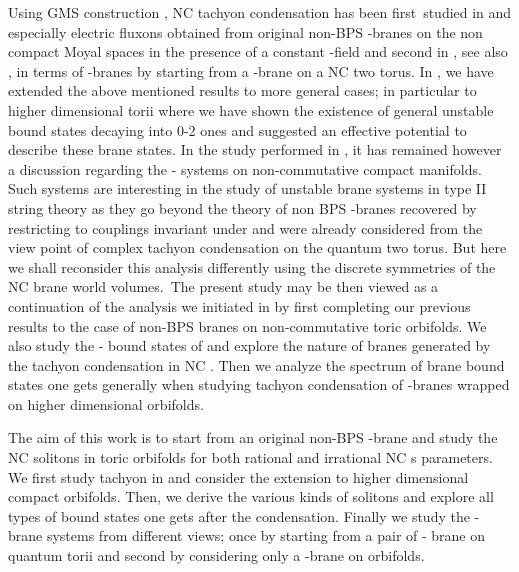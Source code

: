 \documentclass[a4paper,12pt]{article}
\begin{document}
Using GMS construction \cite{e}, NC tachyon condensation has been first\
studied in \cite{f} and especially electric fluxons obtained from original non-BPS \coordHE{}%
-branes on the non compact Moyal spaces in the presence of a constant \myHighlight{$B$}\coordHE{}-field
and second in \cite{g}, see also \cite{h,i}, in terms of \myHighlight{$D0$}\coordHE{}-branes
by starting from a \myHighlight{$D2$}\coordHE{}-brane on a NC two torus. In \cite{j}, we have
extended the above mentioned results to more general cases; in particular to
higher dimensional torii where we have shown the existence of general
unstable bound states decaying into \coordHE{}0-\myHighlight{$D$}\coordHE{}2 ones and suggested an effective
potential to describe these brane states. In the study performed in \cite{j}%
, it has remained however a discussion regarding the
\coordHE{}-\coordHE{} systems on non-commutative compact manifolds.
Such systems are interesting in the study of unstable \coordHE{} brane
systems in type II string theory as they go beyond the theory of
non BPS \myHighlight{$D$}\coordHE{}-branes recovered by restricting to couplings invariant
under \myHighlight{$(-)^{F_L}$}\coordHE{} \cite{k} and were already considered from the
view point of complex tachyon condensation on the quantum two
torus. But here we shall reconsider this analysis differently
using the discrete symmetries of the NC brane world volumes.\ The
present study may be then viewed as a continuation of the analysis
we initiated in \cite{j} by first completing our previous results
to the case of non-BPS branes on non-commutative toric orbifolds.
We also study  the \myHighlight{$D0$}\coordHE{}-\myHighlight{$D2$}\coordHE{} bound states of \cite{g} and explore
the
nature of branes generated by the tachyon condensation in NC \myHighlight{$\mathbb{T}%
_{\theta }^{2}/\mathbb{Z}_{2}$}\coordHE{}. Then we analyze the spectrum of
brane bound states one gets generally when studying tachyon
condensation of \coordHE{}-branes wrapped on higher dimensional
orbifolds.

The aim of this work is to start from an original non-BPS \coordHE{}-brane and
study the NC solitons in \myHighlight{$\mathbb{Z}_{2}$}\coordHE{} toric orbifolds for both rational
and irrational NC \myHighlight{$\theta _{i}^{\prime }$}\coordHE{}s parameters.
 We first study tachyon in \myHighlight{$\mathbb{T}_{\theta }^{2}/\mathbb{Z}%
_{2}$}\coordHE{} and  consider the
extension to higher dimensional compact orbifolds. Then, we derive the
various kinds of solitons and explore all types of bound states one gets after
the condensation. Finally we study the \coordHE{}-\coordHE{} brane systems
from different views; once by starting from a pair of \coordHE{}-\myHighlight{$\overline{%
D}$}\coordHE{} brane on quantum torii and second by considering only a \myHighlight{$D$}\coordHE{}-brane on
orbifolds.
\end{document}
